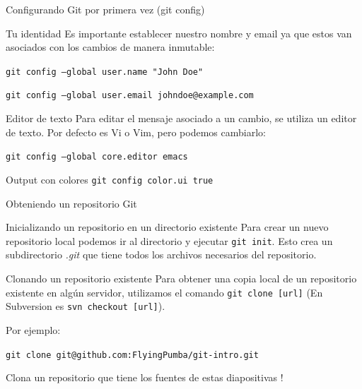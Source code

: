 \documentclass{beamer}
\begin{document}
\begin{frame}{Configurando Git por primera vez (git config)}

    \begin{block}{Tu identidad}
        Es importante establecer nuestro nombre y email ya que estos van asociados con los cambios de manera inmutable:

        \vspace{0.5em}

        \texttt{git config --global user.name "John Doe"}

        \texttt{git config --global user.email johndoe@example.com}
    \end{block}

    \begin{block}{Editor de texto}
        Para editar el mensaje asociado a un cambio, se utiliza un editor de texto.
        Por defecto es Vi o Vim, pero podemos cambiarlo:

        \vspace{0.5em}

        \texttt{git config --global core.editor emacs}
    \end{block}

    \begin{block}{Output con colores}
        \texttt{git config color.ui true}
    \end{block}

\end{frame}

\begin{frame}{Obteniendo un repositorio Git}

    \begin{block}{Inicializando un repositorio en un directorio existente}
        Para crear un nuevo repositorio local podemos ir al directorio y ejecutar
        \texttt{git init}. Esto crea un subdirectorio \textit{.git} que tiene todos
        los archivos necesarios del repositorio.
    \end{block}

    \begin{block}{Clonando un repositorio existente}
        Para obtener una copia local de un repositorio existente en algún servidor,
        utilizamos el comando \texttt{git clone [url]} (En Subversion es \texttt{svn checkout [url]}).

        Por ejemplo:

        \vspace{0.5em}

        \texttt{git clone git@github.com:FlyingPumba/git-intro.git}

        \vspace{0.5em}

        Clona un repositorio que tiene los fuentes de estas diapositivas !

    \end{block}

\end{frame}
\end{document}
